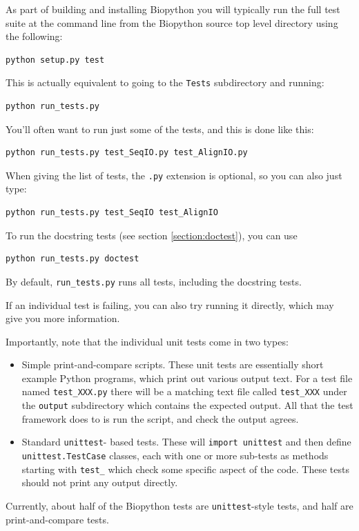 \documentclass{report}
\begin{document}
As part of building and installing Biopython you will typically
run the full test suite at the command line from the Biopython
source top level directory using the following:
\begin{verbatim}
python setup.py test
\end{verbatim}
This is actually equivalent to going to the \verb|Tests|
subdirectory and running:
\begin{verbatim}
python run_tests.py
\end{verbatim}

You'll often want to run just some of the tests, and this is done
like this:
\begin{verbatim}
python run_tests.py test_SeqIO.py test_AlignIO.py
\end{verbatim}
When giving the list of tests, the \verb|.py| extension is optional,
so you can also just type:
\begin{verbatim}
python run_tests.py test_SeqIO test_AlignIO
\end{verbatim}
To run the docstring tests (see section \ref{section:doctest}), you can use
\begin{verbatim}
python run_tests.py doctest
\end{verbatim}
By default, \verb|run_tests.py| runs all tests, including the docstring tests.

If an individual test is failing, you can also try running it
directly, which may give you more information.

Importantly, note that the individual unit tests come in two types:
\begin{itemize}
\item Simple print-and-compare scripts.  These unit tests are
      essentially short example Python programs, which print out
      various output text.  For a test file named \verb|test_XXX.py|
      there will be a matching text file called \verb|test_XXX| under
      the \verb|output| subdirectory which contains the expected
      output.  All that the test framework does to is run the script,
      and check the output agrees.
\item Standard \verb|unittest|- based tests.  These will \verb|import unittest|
      and then define \verb|unittest.TestCase| classes, each with one
      or more sub-tests as methods starting with \verb|test_| which
      check some specific aspect of the code.
      These tests should not print any output directly.
\end{itemize}
Currently, about half of the Biopython tests are \verb|unittest|-style tests, and half are print-and-compare tests.
\end{document}
